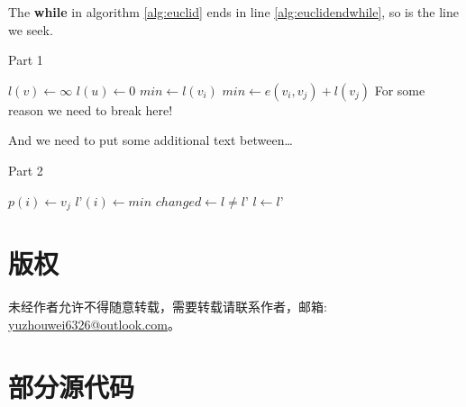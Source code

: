 \documentclass[a4paper]{article} %
\numberwithin{equation}{section} %
\begin{document}
The \textbf{while} in algorithm
\ref{alg:euclid} ends in line
\ref{alg:euclidendwhile}, so
is the line we seek.


\begin{algorithm}[H]
\caption{Part 1}
\begin{algorithmic}[1]
\State $l(v) \leftarrow \infty$
\EndFor
\State $l(u) \leftarrow 0$
\Repeat
{}
\State $min \leftarrow l(v_i)$
\State $min \leftarrow e(v_i, v_j) + l(v_j)$
\State \Comment For some reason we need to break here!
\end{algorithmic}
\end{algorithm}

    And we need to put some additional text between\dots

\begin{algorithm}[H]
\caption{Part 2}
\begin{algorithmic}[1]
\State $p(i) \leftarrow v_j$
\EndIf
\EndFor
\State $l’(i) \leftarrow min$
\EndFor
\State $changed \leftarrow l \not= l’$
\State $l \leftarrow l’$
\EndProcedure
\end{algorithmic}
\end{algorithm}

\appendix
\section{版权}

未经作者允许不得随意转载，需要转载请联系作者，邮箱:\\\href{mailto:yuzhouwei6326@outlook.com}{yuzhouwei6326@outlook.com}。

\section{部分源代码}
\end{document}
